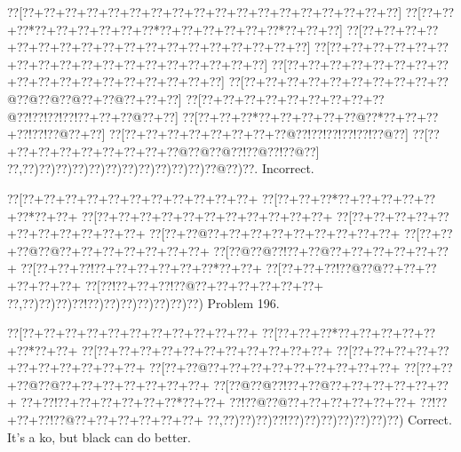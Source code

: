 \documentclass[a5paper]{article}
\begin{document}
\begin{center}
{\goo
\0??[\0??+\0??+\0??+\0??+\0??+\0??+\0??+\0??+\0??+\0??+\0??+\0??+\0??+\0??+\0??+\0??+\0??+\0??]
\0??[\0??+\0??+\0??*\0??+\0??+\0??+\0??+\0??+\0??*\0??+\0??+\0??+\0??+\0??+\0??*\0??+\0??+\0??]
\0??[\0??+\0??+\0??+\0??+\0??+\0??+\0??+\0??+\0??+\0??+\0??+\0??+\0??+\0??+\0??+\0??+\0??+\0??]
\0??[\0??+\0??+\0??+\0??+\0??+\0??+\0??+\0??+\0??+\0??+\0??+\0??+\0??+\0??+\0??+\0??+\0??+\0??]
\0??[\0??+\0??+\0??+\0??+\0??+\0??+\0??+\0??+\0??+\0??+\0??+\0??+\0??+\0??+\0??+\0??+\0??+\0??]
\0??[\0??+\0??+\0??+\0??+\0??+\0??+\0??+\0??+\0??+\0??@\0??@\0??@\0??@\0??+\0??@\0??+\0??+\0??]
\0??[\0??+\0??+\0??+\0??+\0??+\0??+\0??+\0??+\0??@\0??!\0??!\0??!\0??!\0??+\0??+\0??@\0??+\0??]
\0??[\0??+\0??+\0??*\0??+\0??+\0??+\0??+\0??@\0??*\0??+\0??+\0??+\0??!\0??!\0??@\0??+\0??]
\0??[\0??+\0??+\0??+\0??+\0??+\0??+\0??+\0??@\0??!\0??!\0??!\0??!\0??!\0??@\0??]
\0??[\0??+\0??+\0??+\0??+\0??+\0??+\0??+\0??+\0??@\0??@\0??@\0??!\0??@\0??!\0??@\0??]
\0??,\0??)\0??)\0??)\0??)\0??)\0??)\0??)\0??)\0??)\0??)\0??)\0??@\0??)\0??.
}
Incorrect. 

\end{center}
\newpage
\begin{center}
{\goo
\0??[\0??+\0??+\0??+\0??+\0??+\0??+\0??+\0??+\0??+\0??+\0??+
\0??[\0??+\0??+\0??*\0??+\0??+\0??+\0??+\0??+\0??*\0??+\0??+
\0??[\0??+\0??+\0??+\0??+\0??+\0??+\0??+\0??+\0??+\0??+\0??+
\0??[\0??+\0??+\0??+\0??+\0??+\0??+\0??+\0??+\0??+\0??+\0??+
\0??[\0??+\0??@\0??+\0??+\0??+\0??+\0??+\0??+\0??+\0??+\0??+
\0??[\0??+\0??+\0??@\0??@\0??+\0??+\0??+\0??+\0??+\0??+\0??+
\0??[\0??@\0??@\0??!\0??+\0??@\0??+\0??+\0??+\0??+\0??+\0??+
\0??[\0??+\0??+\0??!\0??+\0??+\0??+\0??+\0??+\0??*\0??+\0??+
\0??[\0??+\0??+\0??!\0??@\0??@\0??+\0??+\0??+\0??+\0??+\0??+
\0??[\0??!\0??+\0??+\0??!\0??@\0??+\0??+\0??+\0??+\0??+\0??+
\0??,\0??)\0??)\0??)\0??!\0??)\0??)\0??)\0??)\0??)\0??)\0??)
}
Problem 196.

\end{center}
\begin{center}
{\goo
\0??[\0??+\0??+\0??+\0??+\0??+\0??+\0??+\0??+\0??+\0??+\0??+
\0??[\0??+\0??+\0??*\0??+\0??+\0??+\0??+\0??+\0??*\0??+\0??+
\0??[\0??+\0??+\0??+\0??+\0??+\0??+\0??+\0??+\0??+\0??+\0??+
\0??[\0??+\0??+\0??+\0??+\0??+\0??+\0??+\0??+\0??+\0??+\0??+
\0??[\0??+\0??@\0??+\0??+\0??+\0??+\0??+\0??+\0??+\0??+\0??+
\0??[\0??+\0??+\0??@\0??@\0??+\0??+\0??+\0??+\0??+\0??+\0??+
\0??[\0??@\0??@\0??!\0??+\0??@\0??+\0??+\0??+\0??+\0??+\0??+
\0??+\0??!\0??+\0??+\0??+\0??+\0??+\0??*\0??+\0??+
\0??!\0??@\0??@\0??+\0??+\0??+\0??+\0??+\0??+
\0??!\0??+\0??+\0??!\0??@\0??+\0??+\0??+\0??+\0??+\0??+
\0??,\0??)\0??)\0??)\0??!\0??)\0??)\0??)\0??)\0??)\0??)\0??)
}
Correct. It's a ko, but black can do better.

\end{center}
\end{document}
